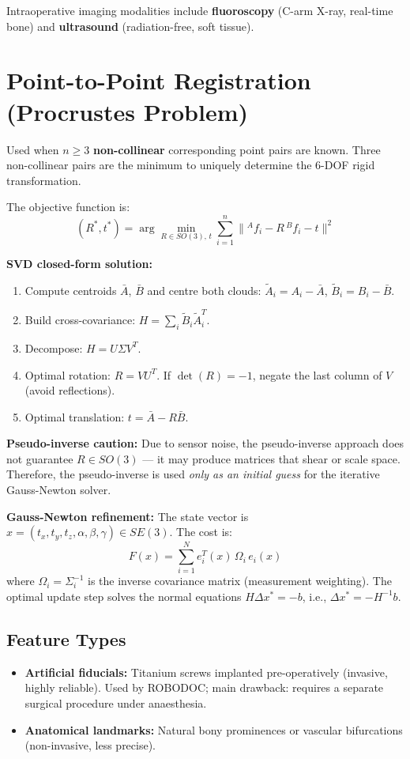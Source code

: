 \documentclass[11pt,a4paper,twoside]{report}
\begin{document}
Intraoperative imaging modalities include \textbf{fluoroscopy} (C-arm X-ray, real-time bone) and \textbf{ultrasound} (radiation-free, soft tissue).

\section{Point-to-Point Registration (Procrustes Problem)}
Used when $n \geq 3$ \textbf{non-collinear} corresponding point pairs are known. Three non-collinear pairs are the minimum to uniquely determine the 6-DOF rigid transformation.

The objective function is:
\begin{equation}
    (R^*, t^*) = \arg\min_{R \in SO(3),\,t}\sum_{i=1}^{n}\|{}^{A}f_i - R\,{}^{B}f_i - t\|^2
\end{equation}

\textbf{SVD closed-form solution:}
\begin{enumerate}
    \item Compute centroids $\bar{A}$, $\bar{B}$ and centre both clouds: $\tilde{A}_i = A_i - \bar{A}$, $\tilde{B}_i = B_i - \bar{B}$.
    \item Build cross-covariance: $H = \sum_i \tilde{B}_i \tilde{A}_i^T$.
    \item Decompose: $H = U\Sigma V^T$.
    \item Optimal rotation: $R = VU^T$. If $\det(R) = -1$, negate the last column of $V$ (avoid reflections).
    \item Optimal translation: $t = \bar{A} - R\bar{B}$.
\end{enumerate}

\textbf{Pseudo-inverse caution:} Due to sensor noise, the pseudo-inverse approach does not guarantee $R \in SO(3)$ — it may produce matrices that shear or scale space. Therefore, the pseudo-inverse is used \textit{only as an initial guess} for the iterative Gauss-Newton solver.

\textbf{Gauss-Newton refinement:} The state vector is $x = (t_x, t_y, t_z, \alpha, \beta, \gamma) \in SE(3)$. The cost is:
\begin{equation}
    F(x) = \sum_{i=1}^{N} e_i^T(x)\,\Omega_i\,e_i(x)
\end{equation}
where $\Omega_i = \Sigma_i^{-1}$ is the inverse covariance matrix (measurement weighting). The optimal update step solves the normal equations $H\Delta x^* = -b$, i.e., $\Delta x^* = -H^{-1}b$.

\subsection{Feature Types}
\begin{itemize}
    \item \textbf{Artificial fiducials:} Titanium screws implanted pre-operatively (invasive, highly reliable). Used by ROBODOC; main drawback: requires a separate surgical procedure under anaesthesia.
    \item \textbf{Anatomical landmarks:} Natural bony prominences or vascular bifurcations (non-invasive, less precise).
\end{itemize}
\end{document}
